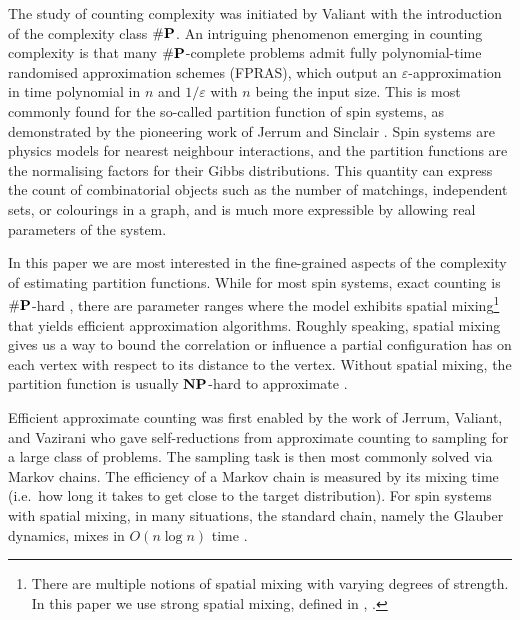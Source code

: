 \documentclass{theoretics}
\newcommand{\eps}{\varepsilon}
\newcommand{\numP}{\#{\textnormal{\textbf{P}}}}
\newcommand{\NP}{\textnormal{\textbf{NP}}}
\begin{document}
The study of counting complexity was initiated by Valiant \cite{Val79} with the introduction of the complexity class $\numP$.
An intriguing phenomenon emerging in counting complexity is that many $\numP$-complete problems admit fully polynomial-time randomised approximation schemes (FPRAS),
which output an $\eps$-approximation in time polynomial in $n$ and $1/\eps$ with $n$ being the input size.
This is most commonly found for the so-called partition function of spin systems, as demonstrated by the pioneering work of Jerrum and Sinclair \cite{JS89,JS93}.
Spin systems are physics models for nearest neighbour interactions, and the partition functions are the normalising factors for their Gibbs distributions.
This quantity can express the count of combinatorial objects such as the number of matchings, independent sets, or colourings in a graph,
and is much more expressible by allowing real parameters of the system.

In this paper we are most interested in the fine-grained aspects of the complexity of estimating partition functions.
While for most spin systems, exact counting is $\numP$-hard \cite{CC17},
there are parameter ranges where the model exhibits spatial mixing\footnote{There are multiple notions of spatial mixing with varying degrees of strength. In this paper we use strong spatial mixing, defined in , . } that yields efficient approximation algorithms. 
Roughly speaking, spatial mixing gives us a way to bound the correlation or influence a partial configuration has on each vertex with respect to its distance to the vertex. 
Without spatial mixing, the partition function is usually $\NP$-hard to approximate \cite{SS14,GSV16,GSV15}.

Efficient approximate counting was first enabled by the work of Jerrum, Valiant, and Vazirani \cite{JVV86} 
who gave self-reductions from approximate counting to sampling for a large class of problems.
The sampling task is then most commonly solved via Markov chains.
The efficiency of a Markov chain is measured by its mixing time (i.e.~how long it takes to get close to the target distribution).
For spin systems with spatial mixing, in many situations, the standard chain, namely the Glauber dynamics, mixes in $O(n\log n)$ time \cite{CLV21,AJKPV22,CFYZ22,CE22}.
\end{document}
